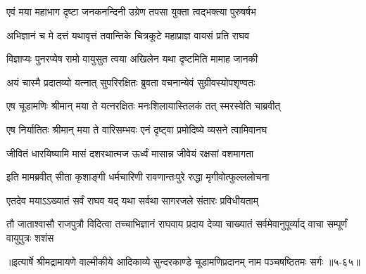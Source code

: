 \twolineshloka
{एवं मया महाभाग दृष्टा जनकनन्दिनी}
{उग्रेण तपसा युक्ता त्वद्भक्त्या पुरुषर्षभ} %

\twolineshloka
{अभिज्ञानं च मे दत्तं यथावृत्तं तवान्तिके}
{चित्रकूटे महाप्राज्ञ वायसं प्रति राघव} %

\twolineshloka
{विज्ञाप्यः पुनरप्येष रामो वायुसुत त्वया}
{अखिलेन यथा दृष्टमिति मामाह जानकी} %

\twolineshloka
{अयं चास्मै प्रदातव्यो यत्नात् सुपरिरक्षितः}
{ब्रुवता वचनान्येवं सुग्रीवस्योपशृण्वतः} %

\twolineshloka
{एष चूडामणिः श्रीमान् मया ते यत्नरक्षितः}
{मनःशिलायास्तिलकं तत् स्मरस्वेति चाब्रवीत्} %

\twolineshloka
{एष निर्यातितः श्रीमान् मया ते वारिसम्भवः}
{एनं दृष्ट्वा प्रमोदिष्ये व्यसने त्वामिवानघ} %

\twolineshloka
{जीवितं धारयिष्यामि मासं दशरथात्मज}
{ऊर्ध्वं मासान्न जीवेयं रक्षसां वशमागता} %

\twolineshloka
{इति मामब्रवीत् सीता कृशाङ्गी धर्मचारिणी}
{रावणान्तःपुरे रुद्धा मृगीवोत्फुल्ललोचना} %

\twolineshloka
{एतदेव मयाऽऽख्यातं सर्वं राघव यद् यथा}
{सर्वथा सागरजले संतारः प्रविधीयताम्} %

\twolineshloka
{तौ जाताश्वासौ राजपुत्रौ विदित्वा तच्चाभिज्ञानं राघवाय प्रदाय}
{देव्या चाख्यातं सर्वमेवानुपूर्व्याद् वाचा सम्पूर्णं वायुपुत्रः शशंस} %


॥इत्यार्षे श्रीमद्रामायणे वाल्मीकीये आदिकाव्ये सुन्दरकाण्डे चूडामणिप्रदानम् नाम पञ्चषष्ठितमः सर्गः ॥५-६५॥
